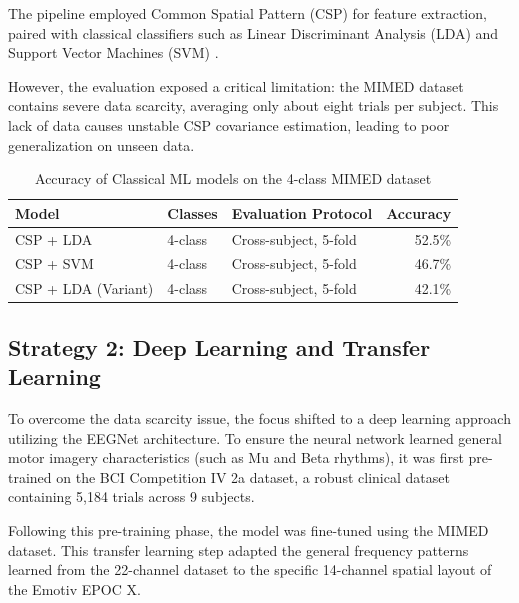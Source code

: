 \documentclass[a4paper, 11pt, openany]{report}
\let\cite\citep
\begin{document}
    The pipeline employed Common Spatial Pattern (CSP) for feature extraction, paired with classical classifiers such as Linear Discriminant Analysis (LDA) and Support Vector Machines (SVM) \cite{blankertz2008optimizing, lotte2018review}.

    However, the evaluation exposed a critical limitation: the MIMED dataset contains severe data scarcity, averaging only about eight trials per subject. This lack of data causes unstable CSP covariance estimation, leading to poor generalization on unseen data.

    \begin{table}[H]
        \centering
        \caption{Accuracy of Classical ML models on the 4-class MIMED dataset}
        \label{tab:classical-ml-results}
        \begin{tabular}{@{} l l l r @{}}
        \toprule
        \textbf{Model} & \textbf{Classes} & \textbf{Evaluation Protocol} & \textbf{Accuracy} \\
        \midrule
        CSP + LDA & 4-class & Cross-subject, 5-fold & 52.5\% \\
        CSP + SVM & 4-class & Cross-subject, 5-fold & 46.7\% \\
        CSP + LDA (Variant) & 4-class & Cross-subject, 5-fold & 42.1\% \\
        \bottomrule
        \end{tabular}
    \end{table}

    \subsection{Strategy 2: Deep Learning and Transfer Learning}
    
    To overcome the data scarcity issue, the focus shifted to a deep learning approach utilizing the EEGNet architecture. To ensure the neural network learned general motor imagery characteristics (such as Mu and Beta rhythms), it was first pre-trained on the BCI Competition IV 2a dataset, a robust clinical dataset containing 5,184 trials across 9 subjects.

    Following this pre-training phase, the model was fine-tuned using the MIMED dataset. This transfer learning step adapted the general frequency patterns learned from the 22-channel dataset to the specific 14-channel spatial layout of the Emotiv EPOC X.
\end{document}
